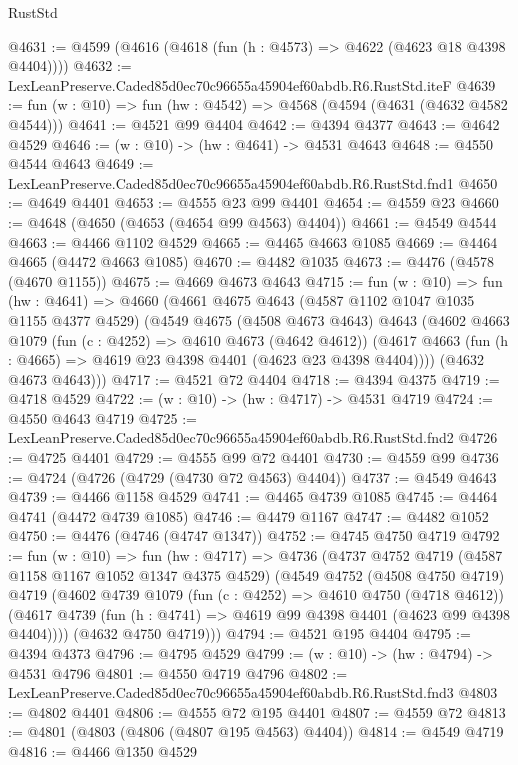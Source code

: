 \begin{lexlean}{RustStd}
\begin{coremodule}
@4631 := @4599 (@4616 (@4618 (fun (h : @4573) => @4622 (@4623 @18 @4398 @4404))))
@4632 := LexLeanPreserve.Caded85d0ec70c96655a45904ef60abdb.R6.RustStd.iteF
@4639 := fun (w : @10) => fun (hw : @4542) => @4568 (@4594 (@4631 (@4632 @4582 @4544)))
@4641 := @4521 @99 @4404
@4642 := @4394 @4377
@4643 := @4642 @4529
@4646 := (w : @10) -> (hw : @4641) -> @4531 @4643
@4648 := @4550 @4544 @4643
@4649 := LexLeanPreserve.Caded85d0ec70c96655a45904ef60abdb.R6.RustStd.fnd1
@4650 := @4649 @4401
@4653 := @4555 @23 @99 @4401
@4654 := @4559 @23
@4660 := @4648 (@4650 (@4653 (@4654 @99 @4563) @4404))
@4661 := @4549 @4544
@4663 := @4466 @1102 @4529
@4665 := @4465 @4663 @1085
@4669 := @4464 @4665 (@4472 @4663 @1085)
@4670 := @4482 @1035
@4673 := @4476 (@4578 (@4670 @1155))
@4675 := @4669 @4673 @4643
@4715 := fun (w : @10) =>
  fun (hw : @4641) =>
  @4660
    (@4661
      @4675
      @4643
      (@4587 @1102 @1047 @1035 @1155 @4377 @4529)
      (@4549
        @4675
        (@4508 @4673 @4643)
        @4643
        (@4602
          @4663
          @1079
          (fun (c : @4252) => @4610 @4673 (@4642 @4612))
          (@4617 @4663 (fun (h : @4665) => @4619 @23 @4398 @4401 (@4623 @23 @4398 @4404))))
        (@4632 @4673 @4643)))
@4717 := @4521 @72 @4404
@4718 := @4394 @4375
@4719 := @4718 @4529
@4722 := (w : @10) -> (hw : @4717) -> @4531 @4719
@4724 := @4550 @4643 @4719
@4725 := LexLeanPreserve.Caded85d0ec70c96655a45904ef60abdb.R6.RustStd.fnd2
@4726 := @4725 @4401
@4729 := @4555 @99 @72 @4401
@4730 := @4559 @99
@4736 := @4724 (@4726 (@4729 (@4730 @72 @4563) @4404))
@4737 := @4549 @4643
@4739 := @4466 @1158 @4529
@4741 := @4465 @4739 @1085
@4745 := @4464 @4741 (@4472 @4739 @1085)
@4746 := @4479 @1167
@4747 := @4482 @1052
@4750 := @4476 (@4746 (@4747 @1347))
@4752 := @4745 @4750 @4719
@4792 := fun (w : @10) =>
  fun (hw : @4717) =>
  @4736
    (@4737
      @4752
      @4719
      (@4587 @1158 @1167 @1052 @1347 @4375 @4529)
      (@4549
        @4752
        (@4508 @4750 @4719)
        @4719
        (@4602
          @4739
          @1079
          (fun (c : @4252) => @4610 @4750 (@4718 @4612))
          (@4617 @4739 (fun (h : @4741) => @4619 @99 @4398 @4401 (@4623 @99 @4398 @4404))))
        (@4632 @4750 @4719)))
@4794 := @4521 @195 @4404
@4795 := @4394 @4373
@4796 := @4795 @4529
@4799 := (w : @10) -> (hw : @4794) -> @4531 @4796
@4801 := @4550 @4719 @4796
@4802 := LexLeanPreserve.Caded85d0ec70c96655a45904ef60abdb.R6.RustStd.fnd3
@4803 := @4802 @4401
@4806 := @4555 @72 @195 @4401
@4807 := @4559 @72
@4813 := @4801 (@4803 (@4806 (@4807 @195 @4563) @4404))
@4814 := @4549 @4719
@4816 := @4466 @1350 @4529

\end{coremodule}
\end{lexlean}

